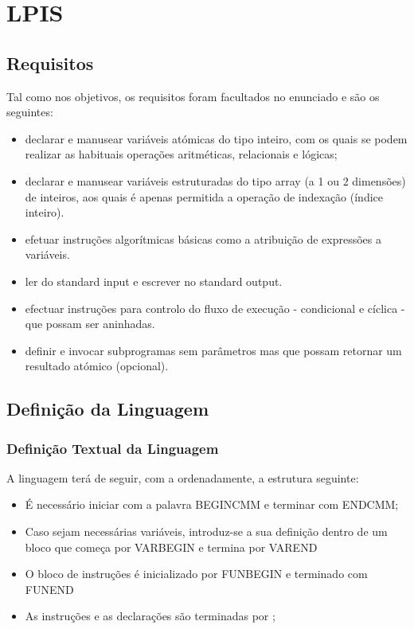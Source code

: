 \documentclass{report}
\begin{document}
\chapter{LPIS}

\section{Requisitos}
Tal como nos objetivos, os requisitos foram facultados no enunciado e são os seguintes:
\begin{itemize}
	\item declarar e manusear variáveis atómicas do tipo inteiro, com os quais se podem realizar as habituais operações aritméticas, relacionais e lógicas;
	\item declarar e manusear variáveis estruturadas do tipo array (a 1 ou 2 dimensões) de inteiros, aos quais é apenas permitida a operação de indexação (índice inteiro).
	\item efetuar instruções algorítmicas básicas como a atribuição de expressões a variáveis.
	\item ler do standard input e escrever no standard output.
	\item efectuar instruções para controlo do fluxo de execução - condicional e cíclica - que possam ser aninhadas.
	\item definir e invocar subprogramas sem parâmetros mas que possam retornar um resultado atómico (opcional).
\end{itemize}

\section{Definição da Linguagem}
\subsection{Definição Textual da Linguagem}
A linguagem terá de seguir, com a ordenadamente, a estrutura seguinte:

\begin{itemize}
	\item É necessário iniciar com a palavra BEGINCMM e terminar com ENDCMM;
	\item Caso sejam necessárias variáveis, introduz-se a sua definição dentro de um bloco que começa por VARBEGIN e termina por VAREND
	\item O bloco de instruções é inicializado por FUNBEGIN e terminado com FUNEND
	\item As instruções e as declarações são terminadas por ;
\end{itemize} 
\end{document}
